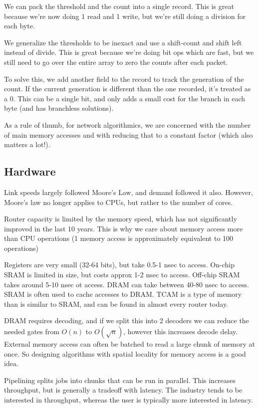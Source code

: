 \documentclass{idc_msc}
\begin{document}
We can pack the threshold and the count into a single record.
This is great because we're now doing 1 read and 1 write, but we're still doing a division for each byte.

We generalize the thresholds to be inexact and use a shift-count and shift left instead of divide.
This is great because we're doing bit ops which are fast, but we still need to go over the entire array to zero the counts after each packet.

To solve this, we add another field to the record to track the generation of the count.
If the current generation is different than the one recorded, it's treated as a 0.
This can be a single bit, and only adds a small cost for the branch in each byte (and has branchless solutions).

As a rule of thumb, for network algorithmics, we are concerned with the number of main memory accesses and with reducing that to a constant factor (which also matters a lot!).

\subsection{Hardware}

Link speeds largely followed Moore's Law, and demand followed it also.
However, Moore's law no longer applies to CPUs, but rather to the number of cores.

Router capacity is limited by the memory speed, which has not significantly improved in the last 10 years.
This is why we care about memory access more than CPU operations (1 memory access is approximately equivalent to 100 operations)

Registers are very small (32-64 bits), but take 0.5-1 nsec to access.
On-chip SRAM is limited in size, but costs approx 1-2 nsec to access.
Off-chip SRAM takes around 5-10 nsec ot access.
DRAM can take between 40-80 nsec to access.
SRAM is often used to cache accesses to DRAM.
TCAM is a type of memory than is similar to SRAM, and can be found in almost every router today.

DRAM requires decoding, and if we split this into 2 decoders we can reduce the needed gates from \(O(n)\) to \(O(\sqrt{n})\), however this increases decode delay.
External memory access can often be batched to read a large chunk of memory at once.
So designing algorithms with spatial locality for memory access is a good idea.

Pipelining splits jobs into chunks that can be run in parallel.
This increases throughput, but is generally a tradeoff with latency.
The industry tends to be interested in throughput, whereas the user is typically more interested in latency.
\end{document}
